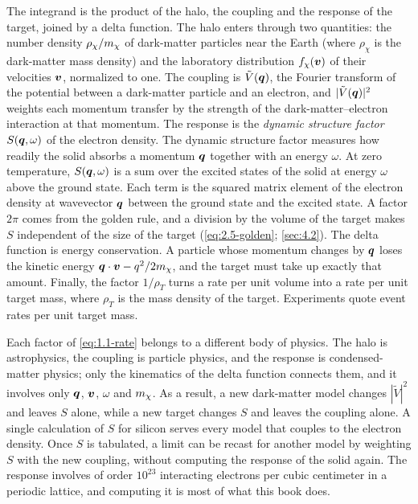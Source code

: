 The integrand is the product of the halo, the coupling and the response of the target, joined by a delta function. The halo enters through two quantities: the number density $\rho_\chi/m_{\chi}$ of dark-matter particles near the Earth (where $\rho_\chi$ is the dark-matter mass density) and the laboratory distribution $f_\chi(\bm{v})$ of their velocities $\bm{v}$, normalized to one. The coupling is $\tilde V(\bm{q})$, the Fourier transform of the potential between a dark-matter particle and an electron, and $|\tilde V(\bm{q})|^2$ weights each momentum transfer by the strength of the dark-matter--electron interaction at that momentum. The response is the \emph{dynamic structure factor} $S(\bm{q},\omega)$ of the electron density. The dynamic structure factor measures how readily the solid absorbs a momentum $\bm{q}$ together with an energy $\omega$. At zero temperature, $S(\bm{q},\omega)$ is a sum over the excited states of the solid at energy $\omega$ above the ground state. Each term is the squared matrix element of the electron density at wavevector $\bm{q}$ between the ground state and the excited state. A factor $2\pi$ comes from the golden rule, and a division by the volume of the target makes $S$ independent of the size of the target (\cref{eq:2.5-golden}; \cref{sec:4.2}). The delta function is energy conservation. A particle whose momentum changes by $\bm{q}$ loses the kinetic energy $\bm{q}\cdot\bm{v} - q^2/2m_{\chi}$, and the target must take up exactly that amount. Finally, the factor $1/\rho_T$ turns a rate per unit volume into a rate per unit target mass, where $\rho_T$ is the mass density of the target. Experiments quote event rates per unit target mass.

Each factor of \cref{eq:1.1-rate} belongs to a different body of physics. The halo is astrophysics, the coupling is particle physics, and the response is condensed-matter physics; only the kinematics of the delta function connects them, and it involves only $\bm{q}$, $\bm{v}$, $\omega$ and $m_{\chi}$. As a result, a new dark-matter model changes $|\tilde V|^2$ and leaves $S$ alone, while a new target changes $S$ and leaves the coupling alone. A single calculation of $S$ for silicon serves every model that couples to the electron density. Once $S$ is tabulated, a limit can be recast for another model by weighting $S$ with the new coupling, without computing the response of the solid again. The response involves of order $10^{23}$ interacting electrons per cubic centimeter in a periodic lattice, and computing it is most of what this book does.

